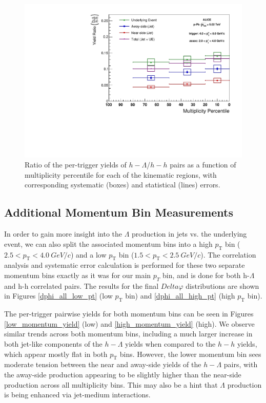 \documentclass[ALICE,manyauthors]{ALICE_analysis_notes}
\begin{document}
\clearpage

\begin{figure}[ht]
\centering
\includegraphics[width=6in]{figures/ratio_plot.pdf}
\caption{Ratio of the per-trigger yields of $h-\Lambda$/$h-h$ pairs as a function of multiplicity percentile for each of the kinematic regions, with corresponding systematic (boxes) and statistical (lines) errors. }
\label{ratioplot}
\end{figure}



\subsection{Additional Momentum Bin Measurements}
In order to gain more insight into the $\Lambda$ production in jets vs. the underlying event, we can also split the associated momentum bins into a high $p_{\text{T}}$ bin ($2.5 < p_{\text{T}} < \SI{4.0}{GeV/c}$) and a low $p_{\text{T}}$ bin ($1.5 < p_{\text{T}} < \SI{2.5}{GeV/c}$).  The correlation analysis and systematic error calculation is performed for these two separate momentum bins exactly as it was for our main $p_{T}$ bin, and is done for both h-$\Lambda$ and h-h correlated pairs. The results for the final $Delta\varphi$ distributions are shown in Figures \ref{dphi_all_low_pt} (low $p_{\text{T}}$ bin) and \ref{dphi_all_high_pt} (high $p_{\text{T}}$ bin).

The per-trigger pairwise yields for both momentum bins can be seen in Figures \ref{low_momentum_yield} (low) and \ref{high_momentum_yield} (high). We observe similar trends across both momentum bins, including a much larger increase in both jet-like components of the $h-\Lambda$ yields when compared to the $h-h$ yields, which appear mostly flat in both $p_\text{T}$ bins. However, the lower momentum bin sees moderate tension between the near and away-side yields of the $h-\Lambda$ pairs, with the away-side production appearing to be slightly higher than the near-side production across all multiplicity bins. This may also be a hint that $\Lambda$ production is being enhanced via jet-medium interactions.
\end{document}
